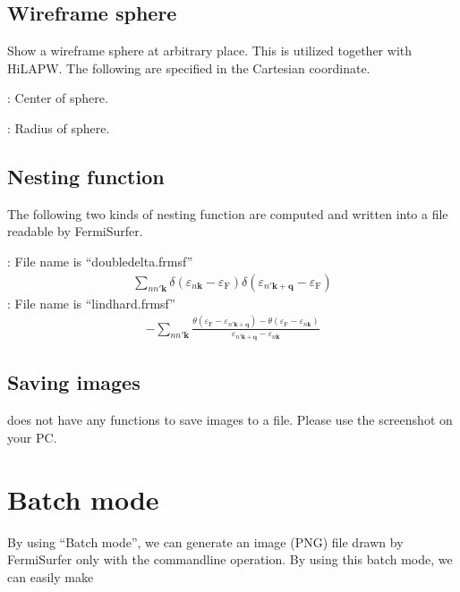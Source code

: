 \documentclass[letterpaper,10pt,pdftex,openany,english]{sphinxmanual}
\begin{document}
\section{Wireframe sphere}
\label{\detokenize{ops:wireframe-sphere}}
\sphinxAtStartPar
Show a wireframe sphere at arbitrary place.
This is utilized together with HiLAPW.
The following are specified in the Cartesian coordinate.

\sphinxAtStartPar
{} : Center of sphere.

\sphinxAtStartPar
{} : Radius of sphere.


\section{Nesting function}
\label{\detokenize{ops:nesting-function}}
\sphinxAtStartPar
The following two kinds of nesting function are computed and written into a file readable by FermiSurfer.

\sphinxAtStartPar
{} : File name is “doubledelta.frmsf”
\begin{equation*}
\begin{split}\sum_{n n' \textbf{k}} \delta(\varepsilon_{n \textbf{k}}-\varepsilon_\textrm{F})
\delta(\varepsilon_{n' \textbf{k}+\textbf{q}}-\varepsilon_\textrm{F})\end{split}
\end{equation*}
\sphinxAtStartPar
{} :  File name is “lindhard.frmsf”
\begin{equation*}
\begin{split}-\sum_{n n' \textbf{k}} \frac{\theta(\varepsilon_\textrm{F} - \varepsilon_{n' \textbf{k}+\textbf{q}})
-\theta(\varepsilon_\textrm{F}-\varepsilon_{n \textbf{k}})}
{\varepsilon_{n' \textbf{k}+\textbf{q}} - \varepsilon_{n \textbf{k}}}\end{split}
\end{equation*}

\section{Saving images}
\label{\detokenize{ops:saving-images}}
\sphinxAtStartPar
{} does not have any functions to save images to a file.
Please use the screenshot on your PC.


\chapter{Batch mode}
\label{\detokenize{batch:batch-mode}}\label{\detokenize{batch::doc}}
\sphinxAtStartPar
By using “Batch mode”, we can generate an image (PNG) file drawn by FermiSurfer
only with the command\sphinxhyphen{}line operation.
By using this batch mode, we can easily make
\end{document}
